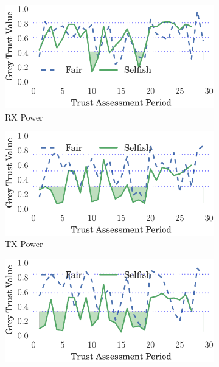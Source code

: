 \documentclass[conference]{IEEEtran}
\begin{document}
\begin{figure}
\begin{subfigure}{0.5\textwidth}
  \centering
  \includegraphics[width=.95\linewidth]{img/trust_bella_all_mobile_emph_ARXP_BadMouthingPowerControl.pdf}
  \caption{RX Power}
  \label{fig:all_mobile_badmouthing_rxp}
\end{subfigure}
\begin{subfigure}{0.5\textwidth}
\centering
  \includegraphics[width=.95\linewidth]{img/trust_bella_all_mobile_emph_ATXP_BadMouthingPowerControl.pdf}
  \caption{TX Power}
  \label{fig:all_mobile_badmouthing_txp}
\end{subfigure}
\begin{subfigure}{0.5\textwidth}
\centering
  \includegraphics[width=.95\linewidth]{img/trust_bella_all_mobile_emph_RXThroughput_BadMouthingPowerControl.pdf}

\end{subfigure}
\end{figure}
\end{document}
